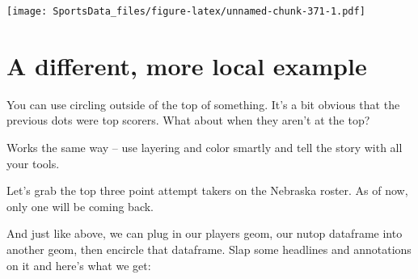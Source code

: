 \documentclass[
]{book}
\newenvironment{Shaded}{\begin{snugshade}}{\end{snugshade}}
\newcommand{\DataTypeTok}[1]{\textcolor[rgb]{0.13,0.29,0.53}{#1}}
\newcommand{\DecValTok}[1]{\textcolor[rgb]{0.00,0.00,0.81}{#1}}
\newcommand{\KeywordTok}[1]{\textcolor[rgb]{0.13,0.29,0.53}{\textbf{#1}}}
\newcommand{\NormalTok}[1]{#1}
\newcommand{\OperatorTok}[1]{\textcolor[rgb]{0.81,0.36,0.00}{\textbf{#1}}}
\newcommand{\StringTok}[1]{\textcolor[rgb]{0.31,0.60,0.02}{#1}}
\begin{document}
\texttt{[image: SportsData\_files/figure-latex/unnamed-chunk-371-1.pdf]}

\hypertarget{a-different-more-local-example}{%
\section{A different, more local example}\label{a-different-more-local-example}}

You can use circling outside of the top of something. It's a bit obvious that the previous dots were top scorers. What about when they aren't at the top?

Works the same way -- use layering and color smartly and tell the story with all your tools.

Let's grab the top three point attempt takers on the Nebraska roster. As of now, only one will be coming back.

\begin{Shaded}
\end{Shaded}

And just like above, we can plug in our players geom, our nutop dataframe into another geom, then encircle that dataframe. Slap some headlines and annotations on it and here's what we get:
\end{document}

